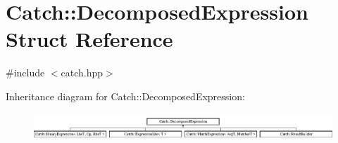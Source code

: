 \hypertarget{structCatch_1_1DecomposedExpression}{\section{Catch\-:\-:Decomposed\-Expression Struct Reference}
\label{structCatch_1_1DecomposedExpression}
}


{\ttfamily \#include $<$catch.\-hpp$>$}

Inheritance diagram for Catch\-:\-:Decomposed\-Expression\-:\begin{figure}[H]
\begin{center}
\leavevmode
\includegraphics[height=1.029412cm]{structCatch_1_1DecomposedExpression}
\end{center}
\end{figure}
